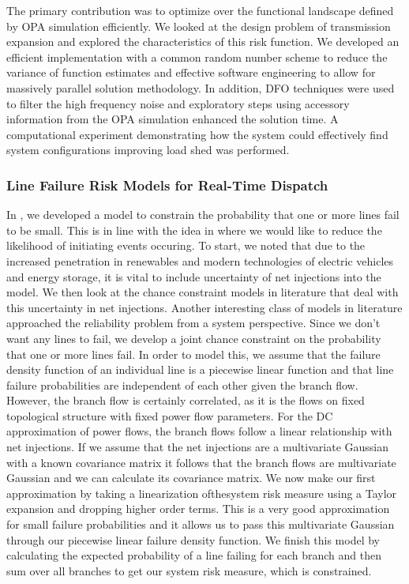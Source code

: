 The primary contribution was to optimize over the functional landscape defined by OPA simulation efficiently.  We looked at the design problem of transmission expansion and explored the characteristics of this risk function.  We developed an efficient implementation with a common random number scheme to reduce the variance of function estimates and effective software engineering to allow for massively parallel solution methodology.  In addition, DFO techniques were used to filter the high frequency noise and exploratory steps using accessory information from the OPA simulation enhanced the solution time.  A computational experiment demonstrating how the system could effectively find system configurations improving load shed was performed.

\subsubsection{Line Failure Risk Models for Real-Time Dispatch}
In , we developed a model to constrain the probability that one or more lines fail to be small.  This is in line with the idea in  where we would like to reduce the likelihood of initiating events occuring.  To start, we noted that due to the increased penetration in renewables and modern technologies of electric vehicles and energy storage, it is vital to include uncertainty of net injections into the model.  We then look at the chance constraint models in literature that deal with this uncertainty in net injections.  Another interesting class of models in literature approached the reliability problem from a system perspective.  Since we don't want any lines to fail, we develop a joint chance constraint on the probability that one or more lines fail.  In order to model this, we assume that the failure density function of an individual line is a piecewise linear function and that line failure probabilities are independent of each other given the branch flow.  However, the branch flow is certainly correlated, as it is the flows on fixed topological structure with fixed power flow parameters.  For the DC approximation of power flows, the branch flows follow a linear relationship with net injections.  If we assume that the net injections are a multivariate Gaussian with a known covariance matrix it follows that the branch flows are multivariate Gaussian and we can calculate its covariance matrix.  We now make our first approximation by taking a linearization ofthesystem risk measure using a Taylor expansion and dropping higher order terms.  This is a very good approximation for small failure probabilities and it allows us to pass this multivariate Gaussian through our piecewise linear failure density function.  We finish this model by calculating the expected probability of a line failing for each branch and then sum over all branches to get our system risk measure, which is constrained.

